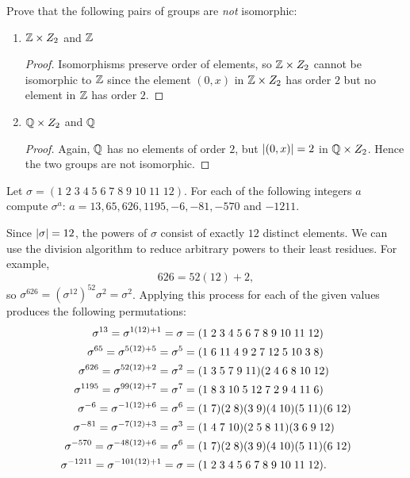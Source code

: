  Prove that the following pairs of groups are {\em not}
isomorphic:
\begin{enumerate}
\item $\mathbb{Z}\times Z_2$ and $\mathbb{Z}$
  \begin{proof}
    Isomorphisms preserve order of elements, so $\mathbb{Z}\times Z_2$ cannot
    be isomorphic to $\mathbb{Z}$ since the element $(0,x)$ in $\mathbb{Z}\times Z_2$
    has order $2$ but no element in $\mathbb{Z}$ has order $2$.
  \end{proof}
\item $\mathbb{Q}\times Z_2$ and $\mathbb{Q}$
  \begin{proof}
    Again, $\mathbb{Q}$ has no elements of order $2$, but $\lvert{(0,x)}\rvert = 2$ in
    $\mathbb{Q}\times Z_2$. Hence the two groups are not isomorphic.
  \end{proof}
\end{enumerate}

 Let $\sigma =
(1\;2\;3\;4\;5\;6\;7\;8\;9\;10\;11\;12)$. For each of the following
integers $a$ compute $\sigma^a$:
$a = 13, 65, 626, 1195, -6, -81, -570$ and $-1211$.
\begin{solution}
  Since $\lvert{\sigma}\rvert = 12$, the powers of $\sigma$ consist of exactly
  $12$ distinct elements. We can use the division algorithm to reduce
  arbitrary powers to their least residues. For example,
  \begin{equation*}
    626 = 52(12) + 2,
  \end{equation*}
  so $\sigma^{626} = (\sigma^{12})^{52}\sigma^2 = \sigma^2$. Applying
  this process for each of the given values produces the following
  permutations:
  \begin{align*}
    \sigma^{13} = \sigma^{1(12) + 1} = \sigma
    &= (1\;2\;3\;4\;5\;6\;7\;8\;9\;10\;11\;12) \\
    \sigma^{65} = \sigma^{5(12) + 5} = \sigma^5
    &= (1\;6\;11\;4\;9\;2\;7\;12\;5\;10\;3\;8) \\
    \sigma^{626} = \sigma^{52(12)+2} = \sigma^2
    &= (1\;3\;5\;7\;9\;11)(2\;4\;6\;8\;10\;12) \\
    \sigma^{1195} = \sigma^{99(12)+7} = \sigma^7
    &= (1\;8\;3\;10\;5\;12\;7\;2\;9\;4\;11\;6) \\
    \sigma^{-6} = \sigma^{-1(12)+6} = \sigma^6
    &= (1\;7)(2\;8)(3\;9)(4\;10)(5\;11)(6\;12) \\
    \sigma^{-81} = \sigma^{-7(12)+3} = \sigma^3
    &= (1\;4\;7\;10)(2\;5\;8\;11)(3\;6\;9\;12) \\
    \sigma^{-570} = \sigma^{-48(12)+6} = \sigma^6
    &= (1\;7)(2\;8)(3\;9)(4\;10)(5\;11)(6\;12) \\
    \sigma^{-1211} = \sigma^{-101(12)+1} = \sigma
    &= (1\;2\;3\;4\;5\;6\;7\;8\;9\;10\;11\;12). \qedhere
  \end{align*}
\end{solution}
